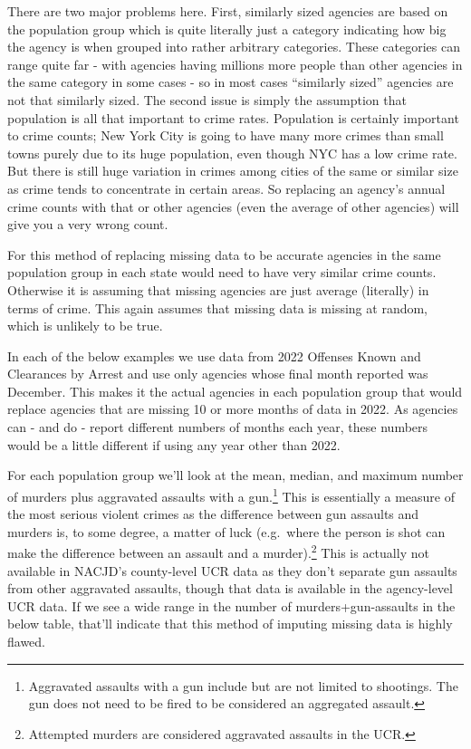 \documentclass[
  12pt,
  openany]{book}
\begin{document}
There are two major problems here. First, similarly sized agencies are based on the population group which is quite literally just a category indicating how big the agency is when grouped into rather arbitrary categories. These categories can range quite far - with agencies having millions more people than other agencies in the same category in some cases - so in most cases ``similarly sized'' agencies are not that similarly sized. The second issue is simply the assumption that population is all that important to crime rates. Population is certainly important to crime counts; New York City is going to have many more crimes than small towns purely due to its huge population, even though NYC has a low crime rate. But there is still huge variation in crimes among cities of the same or similar size as crime tends to concentrate in certain areas. So replacing an agency's annual crime counts with that or other agencies (even the average of other agencies) will give you a very wrong count.

For this method of replacing missing data to be accurate agencies in the same population group in each state would need to have very similar crime counts. Otherwise it is assuming that missing agencies are just average (literally) in terms of crime. This again assumes that missing data is missing at random, which is unlikely to be true.

In each of the below examples we use data from 2022 Offenses Known and Clearances by Arrest and use only agencies whose final month reported was December. This makes it the actual agencies in each population group that would replace agencies that are missing 10 or more months of data in 2022. As agencies can - and do - report different numbers of months each year, these numbers would be a little different if using any year other than 2022.

For each population group we'll look at the mean, median, and maximum number of murders plus aggravated assaults with a gun.\footnote{Aggravated assaults with a gun include but are not limited to shootings. The gun does not need to be fired to be considered an aggregated assault.} This is essentially a measure of the most serious violent crimes as the difference between gun assaults and murders is, to some degree, a matter of luck (e.g.~where the person is shot can make the difference between an assault and a murder).\footnote{Attempted murders are considered aggravated assaults in the UCR.} This is actually not available in NACJD's county-level UCR data as they don't separate gun assaults from other aggravated assaults, though that data is available in the agency-level UCR data. If we see a wide range in the number of murders+gun-assaults in the below table, that'll indicate that this method of imputing missing data is highly flawed.
\end{document}

